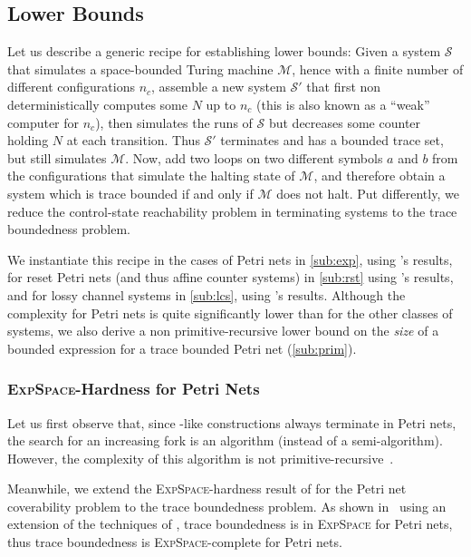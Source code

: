 \documentclass[11pt,reqno,a4paper]{amsart}
\theoremstyle{plain}
\theoremstyle{definition}
\theoremstyle{remark}
\begin{document}
\subsection{Lower Bounds}
Let us describe a generic recipe for establishing lower bounds: Given
a system $\mathcal{S}$ that simulates a space-bounded Turing machine
$\mathcal{M}$, hence with a finite number of different configurations
$n_c$, assemble a new system $\mathcal{S}'$ that first non
deterministically computes some $N$ up to $n_c$ (this is also known as
a ``weak'' computer for $n_c$), then simulates the runs of
$\mathcal{S}$ but decreases some counter holding $N$ at each
transition.  Thus $\mathcal{S}'$ terminates and has a bounded trace
set, but still simulates $\mathcal{M}$.  Now, add two loops on two
different symbols $a$ and $b$ from the configurations that simulate
the halting state of $\mathcal{M}$, and therefore obtain a system
which is trace bounded if and only if $\mathcal{M}$ does not halt.
Put differently, we reduce the control-state reachability problem in
terminating systems to the trace boundedness problem.

We instantiate this recipe in the cases of Petri nets in
\autoref{sub:exp}, using \citet{lipton76}'s results, for
reset Petri nets (and thus affine counter systems) in
\autoref{sub:rst} using \citet{acklcs}'s results, and for lossy
channel systems in \autoref{sub:lcs}, using \citet{CS-lics08}'s
results.  Although the complexity for Petri nets is quite
significantly lower than for the other classes of systems, we also
derive a non primitive-recursive lower bound on the \emph{size} of a
bounded expression for a trace bounded Petri net (\autoref{sub:prim}).  

\subsubsection{\textsc{ExpSpace}-Hardness for Petri Nets}\label{sub:exp}
Let us first observe that, since \citet{kmtree}-like constructions
always terminate in Petri nets, the search for an increasing fork is
an algorithm (instead of a semi-algorithm).  However, the complexity
of this algorithm is not primitive-recursive~\citep{cardoza}.

Meanwhile, we extend the \textsc{ExpSpace}-hardness result of
\citet{lipton76} for the Petri net coverability problem to the trace
boundedness problem.  As shown in~\citep{Schmitz11} using an extension
of the techniques of \citet{rackoff}, trace boundedness is in
\textsc{ExpSpace} for Petri nets, thus trace boundedness is
\textsc{ExpSpace}-complete for Petri nets.
\end{document}
